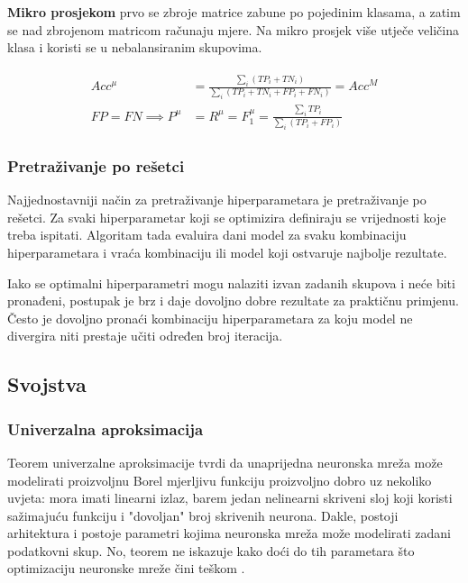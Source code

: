\documentclass[times, utf8, numeric, diplomski]{fer}
\begin{document}
\textbf{Mikro prosjekom} prvo se zbroje matrice zabune po pojedinim klasama, a zatim se nad zbrojenom matricom računaju mjere. Na mikro prosjek više utječe veličina klasa i koristi se u nebalansiranim skupovima.

\begin{align}
\begin{split}
Acc^\mu &= \frac{\sum_i (TP_i+TN_i)}{\sum_i (TP_i+TN_i+FP_i+FN_i)} = Acc^M \\
FP = FN \implies P^\mu &= R^\mu = F_1^\mu = \frac{\sum_i TP_i}{\sum_i (TP_i+FP_i)}
\end{split}
\end{align}

\subsubsection{Pretraživanje po rešetci}
\label{sec:grid_search}
Najjednostavniji način za pretraživanje hiperparametara je pretraživanje po rešetci. Za svaki hiperparametar koji se optimizira definiraju se vrijednosti koje treba ispitati. Algoritam tada evaluira dani model za svaku kombinaciju hiperparametara i vraća kombinaciju ili model koji ostvaruje najbolje rezultate.

Iako se optimalni hiperparametri mogu nalaziti izvan zadanih skupova i neće biti pronađeni, postupak je brz i daje dovoljno dobre rezultate za praktičnu primjenu. Često je dovoljno pronaći kombinaciju hiperparametara za koju model ne divergira niti prestaje učiti određen broj iteracija.

\subsection{Svojstva}
\label{sec:svojstva}

\subsubsection{Univerzalna aproksimacija}
Teorem univerzalne aproksimacije tvrdi da unaprijedna neuronska mreža može modelirati proizvoljnu Borel mjerljivu funkciju proizvoljno dobro uz nekoliko uvjeta: mora imati linearni izlaz, barem jedan nelinearni skriveni sloj koji koristi sažimajuću funkciju i "dovoljan" broj skrivenih neurona. Dakle, postoji arhitektura i postoje parametri kojima neuronska mreža može modelirati zadani podatkovni skup. No, teorem ne iskazuje kako doći do tih parametara što optimizaciju neuronske mreže čini teškom \citep[poglavlje~6.4.1]{goodfellowbook}. 
\end{document}
